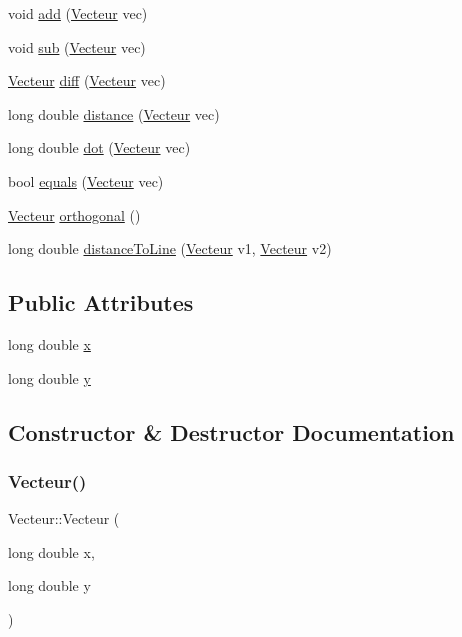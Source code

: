 \begin{DoxyCompactItemize}
\item 
void \mbox{\hyperlink{classVecteur_a10692812b76b66152d4c4bfcba2c449d}{add}} (\mbox{\hyperlink{classVecteur}{Vecteur}} vec)
\item 
void \mbox{\hyperlink{classVecteur_abb5a7f01f57a4227a18939b8c3699305}{sub}} (\mbox{\hyperlink{classVecteur}{Vecteur}} vec)
\item 
\mbox{\hyperlink{classVecteur}{Vecteur}} \mbox{\hyperlink{classVecteur_af37d9e2e371346a60218c78a234285d3}{diff}} (\mbox{\hyperlink{classVecteur}{Vecteur}} vec)
\item 
long double \mbox{\hyperlink{classVecteur_a28b291c3ecbc611175321e67655cd5b5}{distance}} (\mbox{\hyperlink{classVecteur}{Vecteur}} vec)
\item 
long double \mbox{\hyperlink{classVecteur_a4ece0903d42ac6d70fb223e660270d9e}{dot}} (\mbox{\hyperlink{classVecteur}{Vecteur}} vec)
\item 
bool \mbox{\hyperlink{classVecteur_a64470db63328bb99ffa9f0cd3ff8857e}{equals}} (\mbox{\hyperlink{classVecteur}{Vecteur}} vec)
\item 
\mbox{\hyperlink{classVecteur}{Vecteur}} \mbox{\hyperlink{classVecteur_a9796d7d70af9bda7c6b6a5ee338304fe}{orthogonal}} ()
\item 
long double \mbox{\hyperlink{classVecteur_ac57b63f7ff320f2305bcd2ffb4c2ca9d}{distance\+To\+Line}} (\mbox{\hyperlink{classVecteur}{Vecteur}} v1, \mbox{\hyperlink{classVecteur}{Vecteur}} v2)
\end{DoxyCompactItemize}
\subsection*{Public Attributes}
\begin{DoxyCompactItemize}
\item 
long double \mbox{\hyperlink{classVecteur_a074a757613d59358146305d17f9234e5}{x}}
\item 
long double \mbox{\hyperlink{classVecteur_ab68457b2f57879f056bb8c354338f5b9}{y}}
\end{DoxyCompactItemize}


\subsection{Constructor \& Destructor Documentation}
\mbox{\label{classVecteur_ad3074804c5da6664ce7a197562f20d26}} 
\subsubsection{\texorpdfstring{Vecteur()}{Vecteur()}}
{\footnotesize\ttfamily Vecteur\+::\+Vecteur (\begin{DoxyParamCaption}\item[{long double}]{x,  }\item[{long double}]{y }\end{DoxyParamCaption})}

